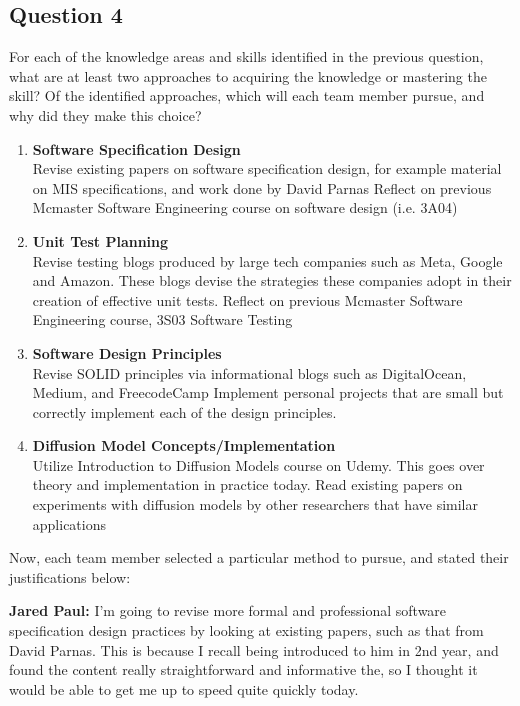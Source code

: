 \documentclass[12pt, titlepage]{article}
\begin{document}
\subsection{Question 4}
For each of the knowledge areas and skills identified in the previous
question, what are at least two approaches to acquiring the knowledge or
mastering the skill?  Of the identified approaches, which will each team
member pursue, and why did they make this choice?\\

\begin{enumerate}
  \item \textbf{Software Specification Design}\\
    Revise existing papers on software specification design, for example material on MIS specifications, and work done by David Parnas
    Reflect on previous Mcmaster Software Engineering course on software design (i.e. 3A04)

  \item \textbf{Unit Test Planning}\\
    Revise testing blogs produced by large tech companies such as Meta, Google and Amazon. These blogs devise the strategies these companies adopt in their creation of effective unit tests.
    Reflect on previous Mcmaster Software Engineering course, 3S03 Software Testing

  \item \textbf{Software Design Principles}\\
    Revise SOLID principles via informational blogs such as DigitalOcean, Medium, and FreecodeCamp
    Implement personal projects that are small but correctly implement each of the design principles.

  \item \textbf{Diffusion Model Concepts/Implementation}\\
    Utilize Introduction to Diffusion Models course on Udemy. This goes over theory and implementation in practice today.
    Read existing papers on experiments with diffusion models by other researchers that have similar applications
\end{enumerate}

Now, each team member selected a particular method to pursue, and stated their justifications below:

\textbf{Jared Paul:} I'm going to revise more formal and professional software specification design practices by looking at existing papers, such as that from David Parnas. This is because I recall being introduced to him in 2nd year, and found the content really straightforward and informative the, so I thought it would be able to get me up to speed quite quickly today.
\end{document}
